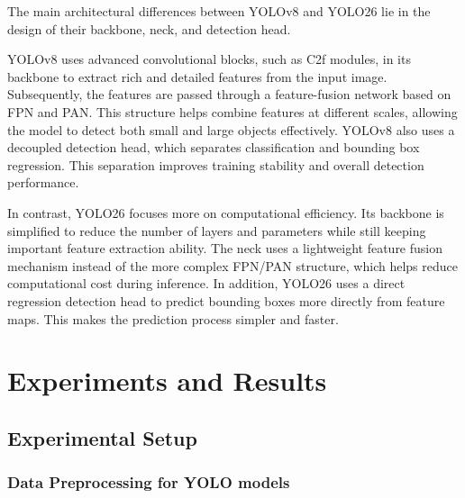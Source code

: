 \documentclass[conference]{IEEEtran}
\begin{document}
The main architectural differences between YOLOv8 and YOLO26 lie in the design of their backbone, neck, and detection head.

YOLOv8 uses advanced convolutional blocks, such as C2f modules, in its backbone to extract rich and detailed features from the input image. Subsequently, the features are passed through a feature-fusion network based on FPN and PAN. This structure helps combine features at different scales, allowing the model to detect both small and large objects effectively. YOLOv8 also uses a decoupled detection head, which separates classification and bounding box regression. This separation improves training stability and overall detection performance.

In contrast, YOLO26 focuses more on computational efficiency. Its backbone is simplified to reduce the number of layers and parameters while still keeping important feature extraction ability. The neck uses a lightweight feature fusion mechanism instead of the more complex FPN/PAN structure, which helps reduce computational cost during inference. In addition, YOLO26 uses a direct regression detection head to predict bounding boxes more directly from feature maps. This makes the prediction process simpler and faster.









\section{Experiments and Results}
\subsection{Experimental Setup}
\subsubsection{Data Preprocessing for YOLO models}
\end{document}
